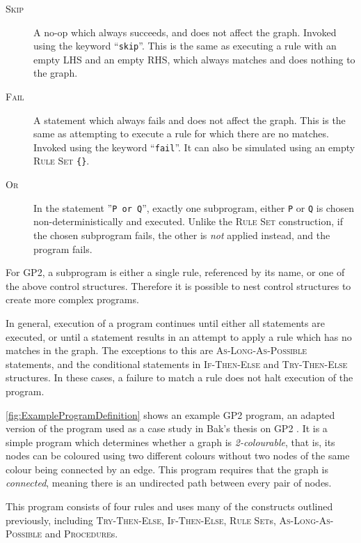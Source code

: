 \documentclass[authoryearcitations]{UoYCSproject}
\begin{document}
\begin{description}
    \item[\textsc{Skip}]
    A no-op which always succeeds, and does not affect the graph. Invoked using the
    keyword ``\texttt{skip}''. This is the same as executing a rule with an empty
    LHS and an empty RHS, which always matches and does nothing to the graph.

    \item[\textsc{Fail}]
    A statement which always fails and does not affect the graph. This is the same
    as attempting to execute a rule for which there are no matches. Invoked using
    the keyword ``\texttt{fail}''. It can also be simulated using an empty
    \textsc{Rule Set} \texttt{\{\}}.

    \item[\textsc{Or}]
    In the statement ''\texttt{P or Q}'', exactly one subprogram, either \texttt{P}
    or \texttt{Q} is chosen non-deterministically and executed. Unlike the
    \textsc{Rule Set} construction, if the chosen subprogram fails, the other is
    \emph{not} applied instead, and the program fails.
\end{description}

For GP2, a subprogram is either a single rule, referenced by its name, or one of
the above control structures. Therefore it is possible to nest control structures
to create more complex programs.

In general, execution of a program continues until either all statements are
executed, or until a statement results in an attempt to apply a rule which has
no matches in the graph. The exceptions to this are \textsc{As-Long-As-Possible}
statements, and the conditional statements in \textsc{If-Then-Else} and
\textsc{Try-Then-Else} structures. In these cases, a failure to match a rule
does not halt execution of the program.

\autoref{fig:ExampleProgramDefinition} shows an example GP2 program, an adapted
version of the program used as a case study in Bak's thesis on GP2 \citep[p.126]{bak2015}.
It is a simple program which determines whether a graph is \emph{2-colourable},
that is, its nodes can be coloured using two different colours without two nodes
of the same colour being connected by an edge. This program requires that the
graph is \emph{connected}, meaning there is an undirected path between every pair
of nodes.

This program consists of four rules and uses many of the constructs outlined
previously, including \textsc{Try-Then-Else}, \textsc{If-Then-Else},
\textsc{Rule Set}s, \textsc{As-Long-As-Possible} and \textsc{Procedure}s.
\end{document}

